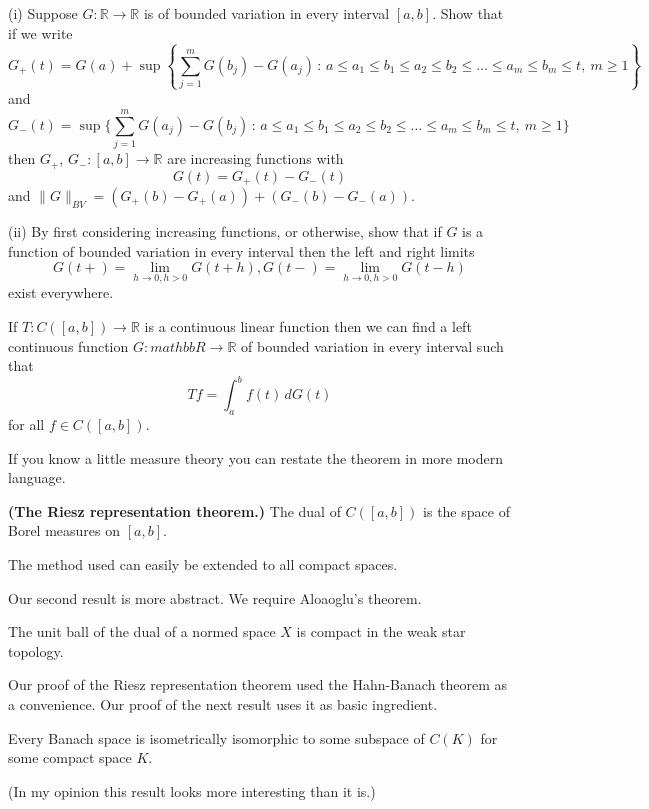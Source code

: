 \begin{added}[Exercise] (i) Suppose $G:{\mathbb R}\rightarrow{\mathbb R}$
is of bounded variation in every interval $[a,b]$. 
Show that if we write
\[G_{+}(t)=G(a)+\sup\left\{\sum_{j=1}^{m}G(b_{j})-G(a_{j})
\,:\,a\leq a_{1}\leq b_{1}\leq a_{2}\leq b_{2}\leq\dots\leq
a_{m}\leq b_{m}\leq t,\ m\geq 1\right\}\]
and
\[G_{-}(t)=\sup\{\sum_{j=1}^{m}G(a_{j})-G(b_{j})
\,:\,a\leq a_{1}\leq b_{1}\leq a_{2}\leq b_{2}\leq\dots\leq
a_{m}\leq b_{m}\leq t,\ m\geq 1\}\]
then $G_{+},\,G_{-}:[a,b]\rightarrow{\mathbb R}$
are increasing functions with
\[G(t)=G_{+}(t)-G_{-}(t)\]
and $\|G\|_{BV}=(G_{+}(b)-G_{+}(a))+(G_{-}(b)-G_{-}(a))$.

(ii) By first considering increasing functions, or otherwise,
show that if $G$ is a function of bounded variation in every interval
then the left and right limits
\[G(t+)=\lim_{h\rightarrow 0,h>0}G(t+h), 
G(t-)=\lim_{h\rightarrow 0,h>0}G(t-h)\]
exist everywhere. 
\end{added}
\begin{theorem} If $T:C([a,b])\rightarrow{\mathbb R}$
is a continuous linear function then we can find
a left continuous function $G:{mathbb R}\rightarrow{\mathbb R}$
of bounded variation in every interval such that
\[Tf=\int_{a}^{b}f(t)\,dG(t)\]
for all $f\in C([a,b])$.
\end{theorem}

If you know a little measure theory you can restate
the theorem in more modern language.
\begin{theorem} {\bf (The Riesz representation theorem.)}
The dual of $C([a,b])$ is the space of Borel
measures on $[a,b]$.
\end{theorem}
The method used can easily be extended to all compact
spaces.

Our second result is more abstract. We require
Aloaoglu's theorem.
\begin{theorem} The unit ball of the dual of a normed
space $X$ is compact in the weak star topology.
\end{theorem}
Our proof of the Riesz representation theorem
used the Hahn-Banach theorem as a convenience.
Our proof of the next result uses it as basic
ingredient.
\begin{theorem} Every Banach space is isometrically
isomorphic to some subspace of $C(K)$ for some
compact space $K$.
\end{theorem}
(In my opinion this result looks more interesting
than it is.)

